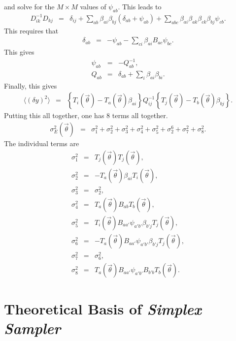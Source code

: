 \documentclass[UserManual.tex]{subfiles}
\begin{document}
and solve for the $M\times M$ values of $\psi_{ab}$. This leads to
\begin{eqnarray}
D^{-1}_{ik}D_{kj}&=&
\delta_{ij}+\sum_{ab}\beta_{ai}\beta_{bj}(\delta_{ab}+\psi_{ab})+\sum_{abc}\beta_{ai}\beta_{ak}\beta_{ck}\beta_{bj}\psi_{cb}.
\end{eqnarray}
This requires that
\begin{eqnarray}
\delta_{ab}&=&-\psi_{ab}-\sum_{ci}\beta_{ai}B_{ac}\psi_{bc}.
\end{eqnarray}
This gives
\begin{eqnarray}
\psi_{ab}&=&-Q^{-1}_{ab},\\
\nonumber
Q_{ab}&=&\delta_{ab}+\sum_i\beta_{ai}\beta_{bi}.
\end{eqnarray}
Finally, this gives
\begin{eqnarray}
\langle(\delta y)^2\rangle&=&
\left\{T_i(\vec{\theta})-T_{a}(\vec{\theta})\beta_{ai}\right\}Q^{-1}_{ij}
\left\{T_j(\vec{\theta})-T_b(\vec{\theta})\beta_{bj}\right\}.
\end{eqnarray}
Putting this all together, one has 8 terms all together.
\begin{eqnarray}
\sigma_E^2(\vec{\theta})&=&
\sigma^2_1+\sigma_2^2+\sigma^2_3+\sigma^2_4+\sigma^2_5+\sigma_2^6+\sigma^2_7+\sigma^2_8.
\end{eqnarray}
The individual terms are
\begin{eqnarray}
\sigma_1^2&=&T_j(\vec{\theta})T_j(\vec{\theta}),\\
\nonumber
\sigma_2^2&=&-T_a(\vec{\theta})\beta_{ai}T_i(\vec{\theta}),\\
\nonumber
\sigma_3^2&=&\sigma_2^2,\\
\nonumber
\sigma_4^2&=&T_a(\vec{\theta})B_{ab}T_b(\vec{\theta}),\\
\nonumber
\sigma_5^2&=&T_i(\vec{\theta})B_{aa'}\psi_{a'b'}\beta_{b'j}T_j(\vec{\theta}),\\
\nonumber
\sigma_6^2&=&-T_a(\vec{\theta})B_{aa'}\psi_{a'b'}\beta_{b'j}T_j(\vec{\theta}),\\
\nonumber
\sigma_7^2&=&\sigma_6^2,\\
\nonumber
\sigma_8^2&=&T_a(\vec{\theta})B_{aa'}\psi_{a'b'}B_{b'b}T_b(\vec{\theta}).
\end{eqnarray}



\section{Theoretical Basis of {\it Simplex Sampler}}\label{sec:simplextheory}
\end{document}
